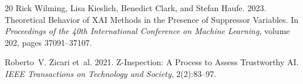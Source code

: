 \documentclass[twoside,11pt]{article}
\begin{document}
\begin{thebibliography}{20}
Rick Wilming, Lisa Kieslich, Benedict Clark, and Stefan Haufe.
2023.
Theoretical Behavior of {XAI} Methods in the Presence of Suppressor Variables.
In \emph{Proceedings of the 40th International Conference on Machine Learning},
volume 202, pages 37091--37107.

Roberto~V. Zicari et~al.
2021.
Z-Inspection\textregistered: A Process to Assess Trustworthy {AI}.
\emph{IEEE Transactions on Technology and Society}, 2(2):83--97.

\end{thebibliography}
\end{document}
